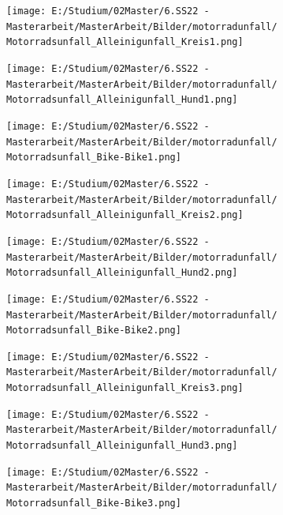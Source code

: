 \begin{figure}[htpb]
	\centering
	\begin{subfigure}{0.28\textwidth}
		\centering
		\texttt{[image: E:/Studium/02Master/6.SS22 - Masterarbeit/MasterArbeit/Bilder/motorradunfall/Motorradsunfall\_Alleinigunfall\_Kreis1.png]}
	\end{subfigure}
	\begin{subfigure}{0.28\textwidth}
		\centering
		\texttt{[image: E:/Studium/02Master/6.SS22 - Masterarbeit/MasterArbeit/Bilder/motorradunfall/Motorradsunfall\_Alleinigunfall\_Hund1.png]}
	\end{subfigure}
	\begin{subfigure}{0.28\textwidth}
		\centering
		\texttt{[image: E:/Studium/02Master/6.SS22 - Masterarbeit/MasterArbeit/Bilder/motorradunfall/Motorradsunfall\_Bike-Bike1.png]}
	\end{subfigure}
	\begin{subfigure}{0.28\textwidth}
		\centering
		\texttt{[image: E:/Studium/02Master/6.SS22 - Masterarbeit/MasterArbeit/Bilder/motorradunfall/Motorradsunfall\_Alleinigunfall\_Kreis2.png]}
	\end{subfigure}
	\begin{subfigure}{0.28\textwidth}
		\centering
		\texttt{[image: E:/Studium/02Master/6.SS22 - Masterarbeit/MasterArbeit/Bilder/motorradunfall/Motorradsunfall\_Alleinigunfall\_Hund2.png]}
	\end{subfigure}
	\begin{subfigure}{0.28\textwidth}
		\centering
		\texttt{[image: E:/Studium/02Master/6.SS22 - Masterarbeit/MasterArbeit/Bilder/motorradunfall/Motorradsunfall\_Bike-Bike2.png]}
	\end{subfigure}
	\begin{subfigure}{0.28\textwidth}
		\centering
		\texttt{[image: E:/Studium/02Master/6.SS22 - Masterarbeit/MasterArbeit/Bilder/motorradunfall/Motorradsunfall\_Alleinigunfall\_Kreis3.png]}
	\end{subfigure}
	\begin{subfigure}{0.28\textwidth}
		\centering
		\texttt{[image: E:/Studium/02Master/6.SS22 - Masterarbeit/MasterArbeit/Bilder/motorradunfall/Motorradsunfall\_Alleinigunfall\_Hund3.png]}
	\end{subfigure}
	\begin{subfigure}{0.28\textwidth}
		\centering
		\texttt{[image: E:/Studium/02Master/6.SS22 - Masterarbeit/MasterArbeit/Bilder/motorradunfall/Motorradsunfall\_Bike-Bike3.png]}
	\end{subfigure}

\end{figure}
